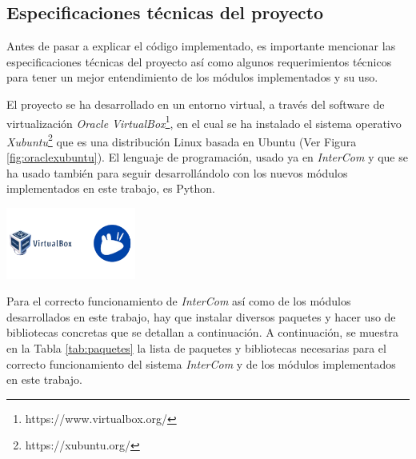 \label{sec:metodologia}

\subsection{Especificaciones técnicas del proyecto}

Antes de pasar a explicar el código implementado, es importante mencionar las especificaciones técnicas del proyecto así como algunos requerimientos técnicos para tener un mejor entendimiento de los módulos implementados y su uso. 
\vspace{\baselineskip}

El proyecto se ha desarrollado en un entorno virtual, a través del software de virtualización \textit{Oracle VirtualBox}\footnote{https://www.virtualbox.org/}, en el cual se ha instalado el sistema operativo \textit{Xubuntu}\footnote{https://xubuntu.org/} que es una distribución Linux basada en Ubuntu (Ver Figura \ref{fig:oraclexubuntu}). El lenguaje de programación, usado ya en \textit{InterCom} y que se ha usado también para seguir desarrollándolo con los nuevos módulos implementados en este trabajo, es Python. 
\vspace{\baselineskip}

\begin{center}
	\includegraphics[width = 0.32\textwidth]{images/oracle_xubuntu.png}
	\label{fig:oraclexubuntu}
\end{center}

\vspace{\baselineskip}

Para el correcto funcionamiento de \textit{InterCom} así como de los módulos desarrollados en este trabajo, hay que instalar diversos paquetes y hacer uso de bibliotecas concretas que se detallan a continuación. A continuación, se muestra en la Tabla \ref{tab:paquetes} la lista de paquetes y bibliotecas necesarias para el correcto funcionamiento del sistema \textit{InterCom} y de los módulos implementados en este trabajo.
\vspace{\baselineskip}

